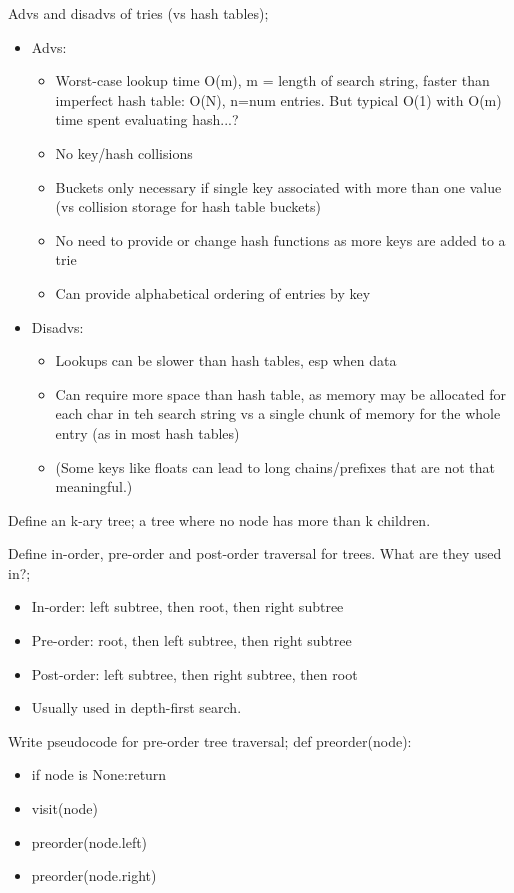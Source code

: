 \documentclass{article}
\begin{document}
Advs and disadvs of tries (vs hash tables); \begin{itemize} \item Advs: \begin{itemize} \item Worst-case lookup time O(m), m = length of search string, faster than imperfect hash table: O(N), n=num entries. But typical O(1) with O(m) time spent evaluating hash...?  \item No key/hash collisions \item Buckets only necessary if single key associated with more than one value (vs collision storage for hash table buckets) \item No need to provide or change hash functions as more keys are added to a trie \item Can provide alphabetical ordering of entries by key \end{itemize} \item Disadvs: \begin{itemize} \item Lookups can be slower than hash tables, esp when data \item Can require more space than hash table, as memory may be allocated for each char in teh search string vs a single chunk of memory for the whole entry (as in most hash tables) \item (Some keys like floats can lead to long chains/prefixes that are not that meaningful.) \end{itemize} \end{itemize}

Define an k-ary tree; a tree where no node has more than k children.

Define in-order, pre-order and post-order traversal for trees. What are they used in?; \begin{itemize} \item In-order: left subtree, then root, then right subtree \item Pre-order: root, then left subtree, then right subtree \item Post-order: left subtree, then right subtree, then root \item Usually used in depth-first search. \end{itemize}

Write pseudocode for pre-order tree traversal; def preorder(node): \begin{itemize} \item if node is None:return \item visit(node) \item preorder(node.left) \item preorder(node.right) \end{itemize}
\end{document}
